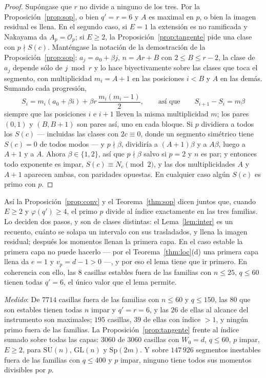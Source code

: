 \documentclass[11pt,a4paper]{article}
\theoremstyle{definition}
\newcommand{\Sp}{\mathrm{Sp}}
\newcommand{\SU}{\mathrm{SU}}
\newcommand{\GL}{\mathrm{GL}}
\newcommand{\cO}{\mathcal{O}}
\newcommand{\medido}[1]{\emph{Medido}: #1}
\begin{document}
\begin{proof}
Sup\'ongase que $r$ no divide a ninguno de los tres. Por la Proposici\'on~\ref{prop:sop}, o bien
$q'=r=6$ y $A$ es maximal en $p$, o bien la imagen residual es llena. En el segundo caso, si $E=1$
la extensi\'on es no ramificada y Nakayama da $A_p=\cO_p$; si $E\ge2$, la
Proposici\'on~\ref{prop:tangente} pide una clase con $p\nmid S(c)$. Mant\'engase la notaci\'on de la
demostraci\'on de la Proposici\'on~\ref{prop:sop}: $a_j=a_0+\beta j$, $n=Ar+B$ con $2\le B\le r-2$,
la clase de $a_j$ depende s\'olo de $j\bmod r$ y lo hace biyectivamente sobre las clases que toca el
segmento, con multiplicidad $m_i=A+1$ en las posiciones $i<B$ y $A$ en las dem\'as. Sumando cada
progresi\'on,
\[
S_i=m_i(a_0+\beta i)+\beta r\,\frac{m_i(m_i-1)}2,\qquad\text{as\'i que}\qquad S_{i+1}-S_i=m\beta
\]
siempre que las posiciones $i$ e $i+1$ lleven la misma multiplicidad $m$; los pares $(0,1)$ y
$(B,B+1)$ son pares as\'i, uno en cada bloque. Si $p$ dividiera a todos los $S(c)$ --- incluidas las
clases con $2c\equiv0$, donde un segmento sim\'etrico tiene $S(c)=0$ de todos modos --- y $p\nmid\beta$,
dividir\'ia a $(A+1)\beta$ y a $A\beta$, luego a $A+1$ y a $A$. Ahora $\beta\in\{1,2\}$, as\'i que
$p\nmid\beta$ salvo si $p=2$ y $n$ es par; y entonces todo exponente es impar, $S(c)\equiv N_c\pmod2$,
y las dos multiplicidades $A$ y $A+1$ aparecen ambas, con paridades opuestas. En cualquier caso
alg\'un $S(c)$ es primo con $p$.
\end{proof}

\noindent As\'i la Proposici\'on~\ref{prop:conv} y el Teorema~\ref{thm:sop} dicen juntos que, cuando
$E\ge2$ y $\varphi(q')\ge4$, el primo $p$ divide al \'indice exactamente en las tres familias. Lo
deciden dos pasos, y son de clases distintas: el Lema~\ref{lem:inter} es un recuento, cu\'anto se
solapa un intervalo con sus trasladados, y llena la imagen residual; despu\'es los momentos llenan la
primera capa. En el caso estable la primera capa no puede hacerlo --- por el
Teorema~\ref{thm:loc}(d) una primera capa llena da $e=1$ y $v_p=d-1>0$ ---, y por eso el lema tiene
que ir primero. En coherencia con ello, las $8$ casillas estables fuera de las familias con
$n\le25$, $q\le60$ tienen todas $q'=6$, el \'unico valor que el lema permite.

\medido{De $7714$ casillas fuera de las familias con $n\le60$ y $q\le150$, las $80$ que son estables
tienen todas $n$ impar y $q'=r=6$, y las $26$ de ellas al alcance del instrumento son maximales;
$195$ casillas, $39$ de ellas con \'indice $>1$, y ning\'un primo fuera de las familias. La
Proposici\'on~\ref{prop:tangente} frente al \'indice sumado sobre todas las capas: $3060$ de $3060$
casillas con $W_0=d$, $q\le60$, $p$ impar, $E\ge2$, para $\SU(n)$, $\GL(n)$ y $\Sp(2m)$. Y sobre
$147\,926$ segmentos inestables fuera de las familias con $q\le400$ y $p$ impar, ninguno tiene todos
sus momentos divisibles por $p$.}
\end{document}
